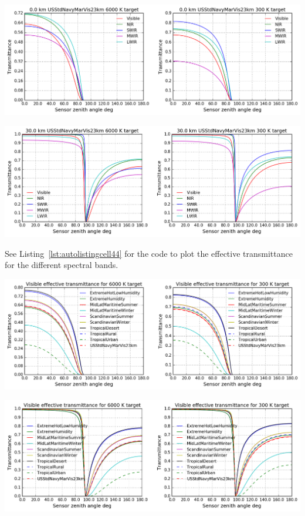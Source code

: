 \documentclass{workpackage}
\begin{document}
\begin{center}
\includegraphics{./pic/Analyse-Standard-Atmospheres_43_18.png}
\end{center}

\begin{center}
\includegraphics{./pic/Analyse-Standard-Atmospheres_43_19.png}
\end{center}



See Listing~\ref{lst:autolistingcell44} for the code to plot the effective transmittance for the different spectral bands.

\begin{center}
\includegraphics{./pic/Analyse-Standard-Atmospheres_44_0.png}
\end{center}

\begin{center}
\includegraphics{./pic/Analyse-Standard-Atmospheres_44_1.png}
\end{center}
\end{document}
